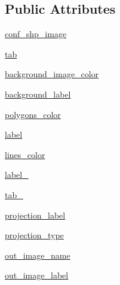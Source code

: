 \subsection*{Public Attributes}
\begin{DoxyCompactItemize}
\item 
\hyperlink{classsrc_1_1client_1_1gui_1_1draw__from__shp1_1_1Ui__DrawSHPImage_ae7420659fde48de19068b53c2ba402db}{conf\_\-shp\_\-image}
\item 
\hyperlink{classsrc_1_1client_1_1gui_1_1draw__from__shp1_1_1Ui__DrawSHPImage_af70d57f9ef716b08e964ab69007ac40e}{tab}
\item 
\hyperlink{classsrc_1_1client_1_1gui_1_1draw__from__shp1_1_1Ui__DrawSHPImage_a86b884bb977cae0d69ad0dc46ada9b24}{background\_\-image\_\-color}
\item 
\hyperlink{classsrc_1_1client_1_1gui_1_1draw__from__shp1_1_1Ui__DrawSHPImage_ad56339a64a6ffbb4d38125315ce722fd}{background\_\-label}
\item 
\hyperlink{classsrc_1_1client_1_1gui_1_1draw__from__shp1_1_1Ui__DrawSHPImage_a99487f3489a48c6b3cf328349a05ad85}{polygons\_\-color}
\item 
\hyperlink{classsrc_1_1client_1_1gui_1_1draw__from__shp1_1_1Ui__DrawSHPImage_abd29d86104d02813400e5bd576e86628}{label}
\item 
\hyperlink{classsrc_1_1client_1_1gui_1_1draw__from__shp1_1_1Ui__DrawSHPImage_a19c7c6064ea65160371b4f1fa01c0689}{lines\_\-color}
\item 
\hyperlink{classsrc_1_1client_1_1gui_1_1draw__from__shp1_1_1Ui__DrawSHPImage_a49c35853ea4a8aa5a4df9250932d7c06}{label\_}
\item 
\hyperlink{classsrc_1_1client_1_1gui_1_1draw__from__shp1_1_1Ui__DrawSHPImage_a51888cdd1ee3bf8084fe4315424900a6}{tab\_}
\item 
\hyperlink{classsrc_1_1client_1_1gui_1_1draw__from__shp1_1_1Ui__DrawSHPImage_a28728193904ea83fa96e265b44e1ea4b}{projection\_\-label}
\item 
\hyperlink{classsrc_1_1client_1_1gui_1_1draw__from__shp1_1_1Ui__DrawSHPImage_a08c921962586ed9693c061fd16435ec3}{projection\_\-type}
\item 
\hyperlink{classsrc_1_1client_1_1gui_1_1draw__from__shp1_1_1Ui__DrawSHPImage_a8d974eab1ebf060444101a724618a444}{out\_\-image\_\-name}
\item 
\hyperlink{classsrc_1_1client_1_1gui_1_1draw__from__shp1_1_1Ui__DrawSHPImage_a6c938948bc9014fea1d52802347399c0}{out\_\-image\_\-label}
\item 

\end{DoxyCompactItemize}
